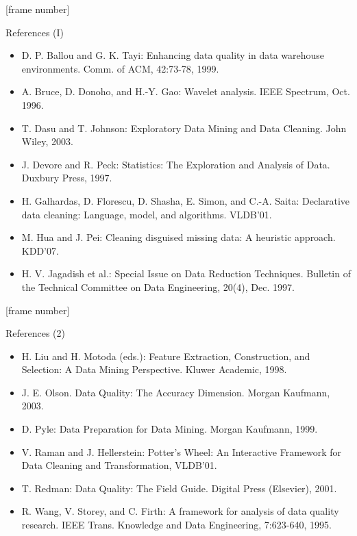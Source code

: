 \documentclass[aspectratio=169,t]{beamer}
\begin{document}
  {
    [frame number]
    \begin{frame}{References (I)}
      \begin{itemize}
        \item D. P. Ballou and G. K. Tayi: Enhancing data quality in data warehouse environments. Comm. of ACM, 42:73-78, 1999.
        \item A. Bruce, D. Donoho, and H.-Y. Gao: Wavelet analysis. IEEE Spectrum, Oct. 1996.
        \item {\color{airforceblue}T. Dasu and T. Johnson:  Exploratory Data Mining and Data Cleaning. John Wiley, 2003.}
        \item J. Devore and R. Peck: Statistics: The Exploration and Analysis of Data. Duxbury Press, 1997.
        \item H. Galhardas, D. Florescu, D. Shasha, E. Simon, and C.-A. Saita: Declarative data cleaning: Language, model, and algorithms. VLDB'01.
        \item M. Hua and J. Pei: Cleaning disguised missing data: A heuristic approach. KDD'07.
        \item {\color{airforceblue}H. V. Jagadish et al.: Special Issue on Data Reduction Techniques.  Bulletin of the Technical Committee on Data Engineering, 20(4), Dec. 1997.}
      \end{itemize}
    \end{frame}
  }


  {
    [frame number]
    \begin{frame}{References (2)}
      \begin{itemize}
        \item H. Liu and H. Motoda (eds.): Feature Extraction, Construction, and Selection: A Data Mining Perspective. Kluwer Academic, 1998.
        \item J. E. Olson. Data Quality: The Accuracy Dimension. Morgan Kaufmann, 2003.
        \item D. Pyle: Data Preparation for Data Mining. Morgan Kaufmann, 1999.
        \item {\color{airforceblue}V. Raman and J. Hellerstein: Potter's Wheel: An Interactive Framework for Data Cleaning and Transformation, VLDB'01.}
        \item T. Redman: Data Quality: The Field Guide. Digital Press (Elsevier), 2001.
        \item R. Wang, V. Storey, and C. Firth: A framework for analysis of data quality research. IEEE Trans. Knowledge and Data Engineering, 7:623-640, 1995.
      \end{itemize}
    \end{frame}
  }
\end{document}

